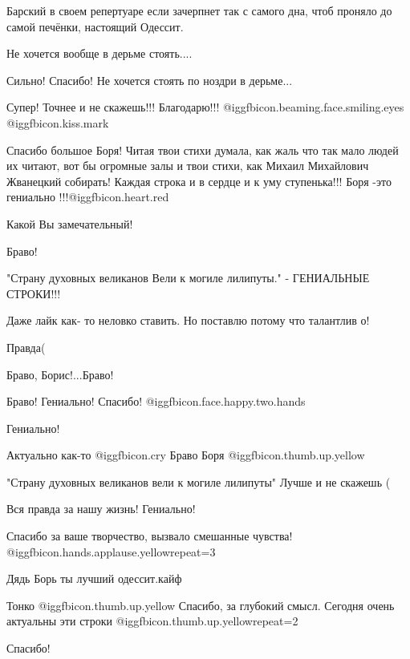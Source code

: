 \begin{itemize}
Барский в своем репертуаре если зачерпнет так с самого дна, чтоб проняло до
самой печёнки, настоящий Одессит.


Не хочется вообще в дерьме стоять....

Сильно! Спасибо! Не хочется стоять по ноздри в дерьме...

Супер! Точнее и не скажешь!!! Благодарю!!!  @igg{fbicon.beaming.face.smiling.eyes}  @igg{fbicon.kiss.mark} 


Спасибо большое Боря! Читая твои стихи думала, как жаль что так мало людей их
читают, вот бы огромные залы и твои стихи, как Михаил Михайлович Жванецкий
собирать! Каждая строка и в сердце и к уму ступенька!!! Боря -это гениально
!!!@igg{fbicon.heart.red}


Какой Вы замечательный!

Браво!

"Страну духовных великанов
Вели к могиле лилипуты." - ГЕНИАЛЬНЫЕ СТРОКИ!!!

Даже лайк как- то неловко ставить. Но поставлю потому что талантлив о!

Правда(

Браво, Борис!...Браво!

Браво! Гениально! Спасибо!  @igg{fbicon.face.happy.two.hands} 

Гениально!

Актуально как-то  @igg{fbicon.cry} 
Браво Боря  @igg{fbicon.thumb.up.yellow} 

"Страну духовных великанов вели к могиле лилипуты" Лучше и не скажешь (

Вся правда за нашу жизнь! Гениально!

Спасибо за ваше творчество, вызвало смешанные чувства! @igg{fbicon.hands.applause.yellow}{repeat=3} 

Дядь Борь ты лучший одессит.кайф

Тонко  @igg{fbicon.thumb.up.yellow} 
Спасибо, за глубокий смысл. Сегодня очень актуальны эти строки  @igg{fbicon.thumb.up.yellow}{repeat=2} 

Спасибо!


\end{itemize}
